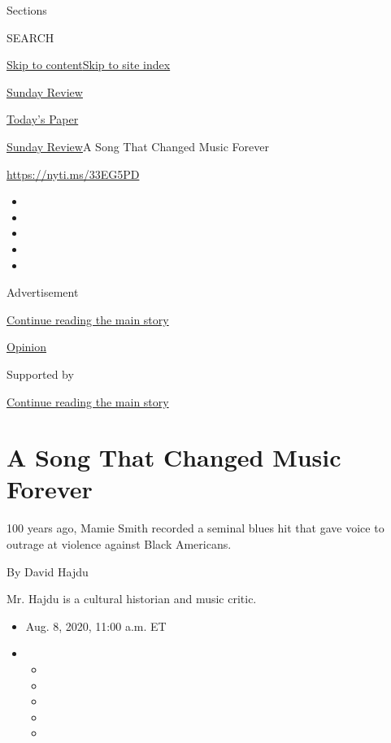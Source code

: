 Sections

SEARCH

\protect\hyperlink{site-content}{Skip to
content}\protect\hyperlink{site-index}{Skip to site index}

\href{https://www.nytimes.com/section/opinion/sunday}{Sunday Review}

\href{https://myaccount.nytimes.com/auth/login?response_type=cookie\&client_id=vi}{}

\href{https://www.nytimes.com/section/todayspaper}{Today's Paper}

\href{/section/opinion/sunday}{Sunday Review}\textbar{}A Song That
Changed Music Forever

\href{https://nyti.ms/33EG5PD}{https://nyti.ms/33EG5PD}

\begin{itemize}
\item
\item
\item
\item
\item
\end{itemize}

Advertisement

\protect\hyperlink{after-top}{Continue reading the main story}

\href{/section/opinion}{Opinion}

Supported by

\protect\hyperlink{after-sponsor}{Continue reading the main story}

\hypertarget{a-song-that-changed-music-forever}{%
\section{A Song That Changed Music
Forever}\label{a-song-that-changed-music-forever}}

100 years ago, Mamie Smith recorded a seminal blues hit that gave voice
to outrage at violence against Black Americans.

By David Hajdu

Mr. Hajdu is a cultural historian and music critic.

\begin{itemize}
\item
  Aug. 8, 2020, 11:00 a.m. ET
\item
  \begin{itemize}
  \item
  \item
  \item
  \item
  \item
  \end{itemize}
\end{itemize}

